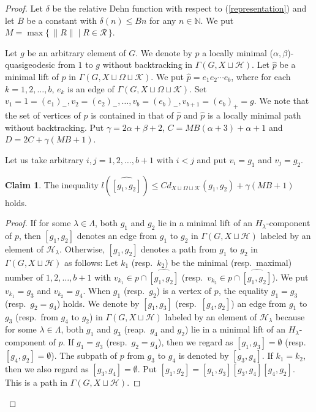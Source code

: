\documentclass{amsart}
\theoremstyle{definition}
\newtheorem{Claim}[Thm]{Claim}
\begin{document}
\begin{proof}
Let $\delta$ be the relative Dehn function with respect to (\ref{representation}) and let $B$ be a constant with $\delta(n) \leq Bn$ for any $n\in{\mathbb{N}}$. 
We put $M=\max\{\,\|R\| \mid R\in{\mathcal R}\,\}$. 

Let $g$ be an arbitrary element of $G$. 
We denote by $p$ a locally minimal ($\alpha,\beta$)-quasigeodesic from $1$ to $g$ without backtracking in $\Gamma(G,X\sqcup {\mathcal H})$. 
Let $\widehat{p}$ be a minimal lift of $p$ in $\Gamma(G,X\sqcup \Omega\sqcup {\mathcal K})$. 
We put $\widehat{p}=e_1 e_2 \cdots e_b$, where for each $k=1,2,\ldots, b$, $e_k$ is an edge of $\Gamma(G,X\sqcup \Omega \sqcup {\mathcal K})$. 
Set $v_1=1=(e_1)_-, v_2=(e_2)_-, \ldots, v_b=(e_b)_-, v_{b+1}=(e_b)_+=g$. 
We note that the set of vertices of $p$ is contained in that of $\widehat p$ and $\widehat p$ is a locally minimal path without backtracking. 
Put $\gamma=2\alpha+\beta+2$, $C=MB(\alpha+3)+\alpha+1$ and $D=2C+\gamma(MB+1)$.  

Let us take arbitrary $i, j =1,2,\ldots,b+1$ with $i < j$ and put $v_i=g_1$ and $v_j=g_2$. 

\begin{Claim}
The inequality $l(\widehat{[g_1,g_2]})\leq C d_{X\sqcup \Omega\sqcup {\mathcal K}}(g_1,g_2)+\gamma(MB+1)$ holds. 
\end{Claim}

\begin{proof}
If for some $\lambda\in \Lambda$, both $g_1$ and $g_2$ lie in a minimal lift of an $H_\lambda$-component of $p$, then $[g_1,g_2]$ denotes an edge from $g_1$ to $g_2$ in $\Gamma(G,X\sqcup {\mathcal H})$ labeled by an element of ${\mathcal H}_\lambda$. 
Otherwise, $[g_1,g_2]$ denotes a path from $g_1$ to $g_2$ in $\Gamma(G,X\sqcup {\mathcal H})$ as follows:
Let $k_1$ (resp.\ $k_2$) be the minimal (resp.\ maximal) number of $1,2,\ldots,b+1$ with $v_{k_1}\in p\cap\widehat{[g_1,g_2]}$ (resp.\ $v_{k_2}\in p\cap\widehat{[g_1,g_2]}$). 
We put $v_{k_1}=g_3$ and $v_{k_2}=g_4$. 
When $g_1$ (resp.\ $g_2$) is a vertex of $p$, the equality $g_1=g_3$ (resp.\ $g_2=g_4$) holds.  
We denote by $[g_1,g_3]$ (resp.\ $[g_4,g_2]$) an edge from $g_1$ to $g_3$ (resp.\ from $g_4$ to $g_2$) in $\Gamma(G,X\sqcup {\mathcal H})$ labeled by an element of ${\mathcal H}_\lambda$ because for some $\lambda\in\Lambda$, both $g_1$ and $g_3$ (reap.\ $g_4$ and $g_2$) lie in a minimal lift of an $H_\lambda$-component of $p$. 
If $g_1=g_3$ (resp.\ $g_2=g_4$), then we regard as $[g_1,g_3]=\emptyset$ (resp.\ $[g_4,g_2]=\emptyset$). 
The subpath of $p$ from $g_3$  to $g_4$ is denoted by $[g_3,g_4]$. 
If $k_1=k_2$, then we also regard as $[g_3,g_4]=\emptyset$. 
Put $[g_1,g_2]=[g_1,g_3][g_3,g_4][g_4,g_2]$.  
This is a path in $\Gamma(G,X\sqcup {\mathcal H})$. 


\end{proof}
\end{proof}
\end{document}
